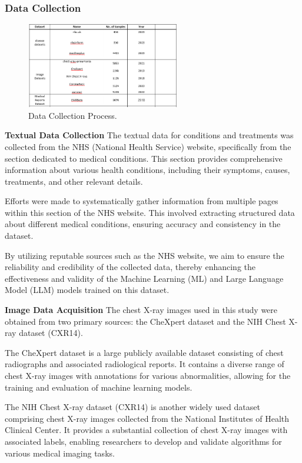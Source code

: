 \subsubsection{Data Collection}


\begin{figure}[H]
    \centering
    \includegraphics[width=0.6\textwidth]{./Figures/data.png}
    \caption{Data Collection Process.}
    \label{fig:datacollection}
\end{figure}

\textbf{Textual Data Collection}
The textual data for conditions and treatments was collected from the NHS (National Health Service) website, specifically from the section dedicated to medical conditions. This section provides comprehensive information about various health conditions, including their symptoms, causes, treatments, and other relevant details.

Efforts were made to systematically gather information from multiple pages within this section of the NHS website. This involved extracting structured data about different medical conditions, ensuring accuracy and consistency in the dataset.

By utilizing reputable sources such as the NHS website, we aim to ensure the reliability and credibility of the collected data, thereby enhancing the effectiveness and validity of the Machine Learning (ML) and Large Language Model (LLM) models trained on this dataset.


\textbf{Image Data Acquisition}
The chest X-ray images used in this study were obtained from two primary sources: the CheXpert dataset and the NIH Chest X-ray dataset (CXR14).

The CheXpert dataset is a large publicly available dataset consisting of chest radiographs and associated radiological reports. It contains a diverse range of chest X-ray images with annotations for various abnormalities, allowing for the training and evaluation of machine learning models.

The NIH Chest X-ray dataset (CXR14)  is another widely used dataset comprising chest X-ray images collected from the National Institutes of Health Clinical Center. It provides a substantial collection of chest X-ray images with associated labels, enabling researchers to develop and validate algorithms for various medical imaging tasks.

